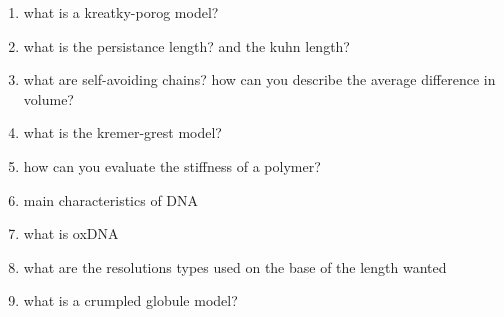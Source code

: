 {\begin{itemize}
\begin{enumerate}
        \item what is a kreatky-porog model?
        \item what is the persistance length? and the kuhn length?
        \item what are self-avoiding chains? how can you describe the average difference in volume?
        \item what is the kremer-grest model?
        \item how can you evaluate the stiffness of a polymer?
        \item main characteristics of DNA
        \item what is oxDNA
        \item what are the resolutions types used on the base of the length wanted
        \item what is a crumpled globule model?
    \end{enumerate}
\end{itemize}
}